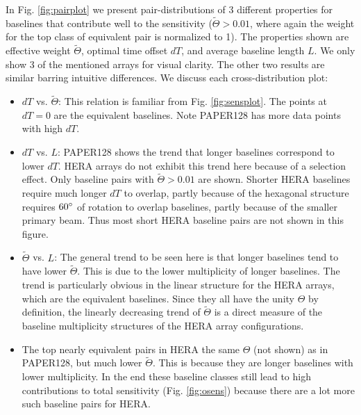 \documentclass[twocolumn,apj,numberedappendix]{emulateapj}
\renewcommand\[{\begin{equation}}
\renewcommand\]{\end{equation}}
\begin{document}
In Fig. \ref{fig:pairplot} we present pair-distributions of 3 different properties for baselines that contribute well to the sensitivity ($\widetilde{\Theta}>0.01$, where again the weight for the top class of equivalent pair is normalized to 1). The properties shown are effective weight $\widetilde{\Theta}$, optimal time offset $dT$, and average baseline length $L$. We only show 3 of the mentioned arrays for visual clarity. The other two results are similar barring intuitive differences. We discuss each cross-distribution plot:
\begin{itemize}

\item $dT$ vs. $\widetilde{\Theta}$:
This relation  is familiar from Fig. \ref{fig:sensplot}. The points at $dT=0$ are the equivalent baselines. Note PAPER128 has more data points with high $dT$. 

\item $dT$ vs. $L$:
PAPER128 shows the trend that longer baselines correspond to lower $dT$. HERA arrays do not exhibit this trend here because of a selection effect. Only baseline pairs with $\widetilde{\Theta}>0.01$ are shown. Shorter HERA baselines require much longer $dT$ to overlap, partly because of the hexagonal structure requires $60\degree$ of rotation to overlap baselines, partly because of the smaller primary beam. Thus most short HERA baseline pairs are not shown in this figure.


\item $\widetilde{\Theta}$ vs. $L$:
The general trend to be seen here is that longer baselines tend to have lower $\widetilde{\Theta}$. This is due to the lower multiplicity of longer baselines. The trend is particularly obvious in the linear structure for the HERA arrays, which are the equivalent baselines. Since they all have the unity $\Theta$ by definition, the linearly decreasing trend of $\widetilde{\Theta}$ is a direct measure of the baseline multiplicity structures of the HERA array configurations.

\item The top nearly equivalent pairs in HERA the same $\Theta$ (not shown) as in PAPER128, but much lower $\widetilde{\Theta}$. This is because they are longer baselines with lower multiplicity. In the end these baseline classes still lead to high contributions to total sensitivity (Fig. \ref{fig:osens}) because there are a lot more such baseline pairs for HERA.  

\end{itemize}
\end{document}
